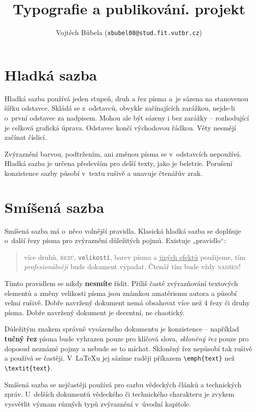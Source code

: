 \documentclass[10 pt, twocolumn]{article}
\title{\textmd{Typografie a publikování\space\space   1. projekt}\\[2.5mm]}
\author{\textmd Vojtěch Bůbela (\texttt{xbubel08@stud.fit.vutbr.cz})}
\date{}
\begin{document}
\maketitle


\section{Hladká sazba}
Hladká sazba používá jeden stupeň, druh a řez písma a~je sázena na stanovenou šířku odstavce. Skládá se z~odstavců, obvykle začínajících zarážkou, nejde-li o~první odstavec za nadpisem. Mohou ale být sázeny i bez zarážky -- rozhodující je celková grafická úprava. Odstavec končí východovou řádkou. Věty nesmějí začínat číslicí.

Zvýraznění barvou, podtržením, ani změnou písma se v~odstavcích nepoužívá. Hladká sazba je určena především pro delší texty, jako je beletrie. Porušení konzistence sazby působí v~textu rušivě a unavuje čtenářův zrak.


\section{Smíšená sazba}


Smíšená sazba má o~něco volnější pravidla. Klasická hladká sazba se doplňuje o~další řezy písma pro zvýraznění důležitých pojmů. Existuje „pravidlo“:

\begin{quotation}
\textsf{ více druhů}, \textsc{řezů}, \texttt{\tiny velikostí}, barev písma a \underline {jiných efektů} použijeme, tím \textit{\large profesionálněji} bude dokument vypadat. Čtenář tím bude vždy \textsc{nadšen}!
\end{quotation}

Tímto pravidlem se nikdy \textbf{nesmíte} řídit. Příliš časté {\large zvýrazňování} textových elementů a změny velikosti {\huge písma} jsou známkou amatérismu autora a působí {\Huge velmi} rušivě. Dobře navržený dokument nemá obsahovat více než
4 řezy či druhy písma. Dobře navržený dokument je decentní, ne chaotický.

Důležitým znakem správně vysázeného dokumentu je konzistence -- například \textbf{tučný řez} písma bude vyhrazen pouze pro klíčová slova,\textsl{ skloněný řez} pouze pro doposud neznámé pojmy a nebude se to míchat. Skloněný řez nepůsobí tak rušivě a používá se častěji. V~\LaTeX u jej sázíme raději příkazem \verb!\emph{text}! než \verb!\textit{text}!.

Smíšená sazba se nejčastěji používá pro sazbu vědeckých článků a technických zpráv. U~delších dokumentů vědeckého či technického charakteru je zvykem vysvětlit význam různých typů zvýraznění v~úvodní kapitole.
\end{document}
